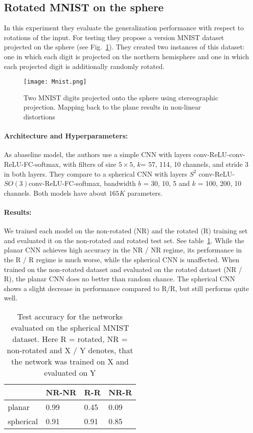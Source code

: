 \documentclass[10pt,twocolumn,letterpaper]{article}
\begin{document}
\subsection{Rotated MNIST on the sphere}
In this experiment they evaluate the generalization performance with respect to rotations of the input. For testing they propose a version MNIST dataset projected on the sphere (see Fig.~\ref{Fig2}). They created two instances of this dataset: one in which each digit is projected on the northern hemisphere and one in which each projected digit is additionally randomly rotated.
\begin{figure}
\centering
\texttt{[image: Mnist.png]}
\caption{Two MNIST digits projected onto the sphere using stereographic projection. Mapping back to the plane results in non-linear distortions}
\label{Fig2}
\end{figure}
\paragraph{Architecture and Hyperparameters:} As abaseline model, the authors use a simple CNN with layers conv-ReLU-conv-ReLU-FC-softmax, with
filters of size $5\times5$, $k$= 57, 114, 10 channels, and stride 3 in both layers. They compare to a spherical CNN with layers $S^2$ conv-ReLU-
$SO(3)$conv-ReLU-FC-softmax, bandwidth $b$ = 30, 10, 5 and $k$ = 100, 200, 10 channels. Both models have about $165K$ parameters. 
\paragraph{Results:}We trained each model on the non-rotated (NR) and the rotated (R) training set and evaluated it on the non-rotated and rotated test set. See table~\ref{T1}. While the planar CNN achieves high accuracy in the NR / NR regime, its performance
in the R / R regime is much worse, while the spherical CNN is unaffected. When trained on the non-rotated dataset and evaluated on the rotated dataset (NR / R), the planar CNN does no better than random chance. The spherical CNN shows a slight decrease in performance compared to R/R, but still performs quite well.
  \begin{table}[!htbp]
  \centering
 \begin{tabular}{p{2cm}|p{1cm}p{1cm}p{1cm}}
      & NR-NR & R-R & NR-R \\
   \hline
   planar & 0.99 & 0.45 & 0.09 \\
   spherical & 0.91 & 0.91 & 0.85 \\
   \hline 
  \end{tabular}
  \caption{Test accuracy for the networks evaluated on the spherical MNIST dataset. Here R = rotated, NR = non-rotated and X / Y denotes, that the network was trained on X and evaluated on Y} \label{T1}
  \end{table}
\end{document}
